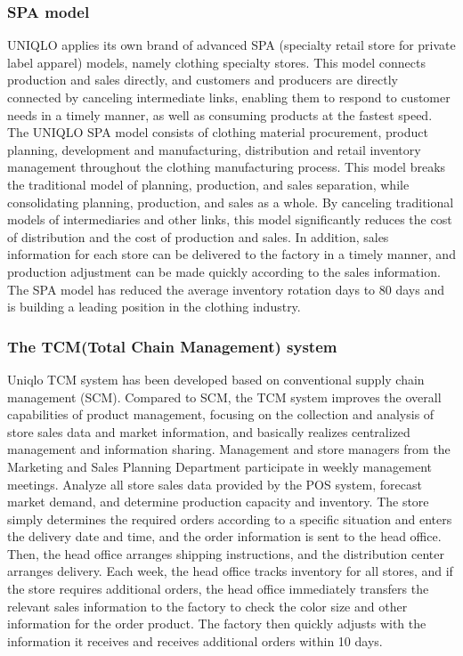 \documentclass[12pt,a4paper]{article}
\begin{document}
\hypertarget{spa-model}{%
\subsubsection{SPA model}\label{spa-model}}

UNIQLO applies its own brand of advanced SPA (specialty retail store for
private label apparel) models, namely clothing specialty stores. This
model connects production and sales directly, and customers and
producers are directly connected by canceling intermediate links,
enabling them to respond to customer needs in a timely manner, as well
as consuming products at the fastest speed. The UNIQLO SPA model
consists of clothing material procurement, product planning, development
and manufacturing, distribution and retail inventory management
throughout the clothing manufacturing process. This model breaks the
traditional model of planning, production, and sales separation, while
consolidating planning, production, and sales as a whole. By canceling
traditional models of intermediaries and other links, this model
significantly reduces the cost of distribution and the cost of
production and sales. In addition, sales information for each store can
be delivered to the factory in a timely manner, and production
adjustment can be made quickly according to the sales information. The
SPA model has reduced the average inventory rotation days to 80 days and
is building a leading position in the clothing industry.

\hypertarget{the-tcmtotal-chain-management-system}{%
\subsubsection{The TCM(Total Chain Management)
system}\label{the-tcmtotal-chain-management-system}}

Uniqlo TCM system has been developed based on conventional supply chain
management (SCM). Compared to SCM, the TCM system improves the overall
capabilities of product management, focusing on the collection and
analysis of store sales data and market information, and basically
realizes centralized management and information sharing. Management and
store managers from the Marketing and Sales Planning Department
participate in weekly management meetings. Analyze all store sales data
provided by the POS system, forecast market demand, and determine
production capacity and inventory. The store simply determines the
required orders according to a specific situation and enters the
delivery date and time, and the order information is sent to the head
office. Then, the head office arranges shipping instructions, and the
distribution center arranges delivery. Each week, the head office tracks
inventory for all stores, and if the store requires additional orders,
the head office immediately transfers the relevant sales information to
the factory to check the color size and other information for the order
product. The factory then quickly adjusts with the information it
receives and receives additional orders within 10 days.
\end{document}
